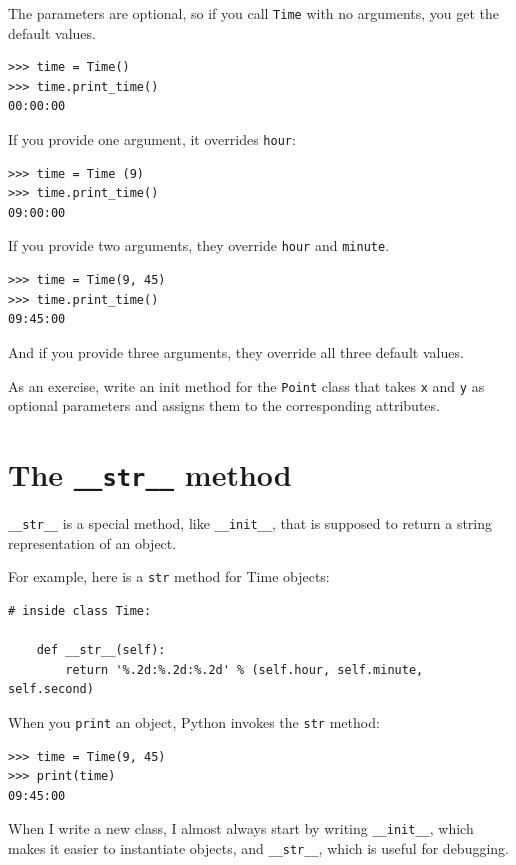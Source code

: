 \documentclass[10pt]{book}
\begin{document}
The parameters are optional, so if you call {\tt Time} with
no arguments, you get the default values.

\begin{verbatim}
>>> time = Time()
>>> time.print_time()
00:00:00
\end{verbatim}
%
If you provide one argument, it overrides {\tt hour}:

\begin{verbatim}
>>> time = Time (9)
>>> time.print_time()
09:00:00
\end{verbatim}
%
If you provide two arguments, they override {\tt hour} and
{\tt minute}.

\begin{verbatim}
>>> time = Time(9, 45)
>>> time.print_time()
09:45:00
\end{verbatim}
%
And if you provide three arguments, they override all three
default values.

As an exercise, write an init method for the {\tt Point} class that takes
{\tt x} and {\tt y} as optional parameters and assigns
them to the corresponding attributes.


\section{The {\tt \_\_str\_\_} method}

\verb"__str__" is a special method, like \verb"__init__",
that is supposed to return a string representation of an object.

For example, here is a {\tt str} method for Time objects:

\begin{verbatim}
# inside class Time:

    def __str__(self):
        return '%.2d:%.2d:%.2d' % (self.hour, self.minute, self.second)
\end{verbatim}
%
When you {\tt print} an object, Python invokes the {\tt str} method:

\begin{verbatim}
>>> time = Time(9, 45)
>>> print(time)
09:45:00
\end{verbatim}
%
When I write a new class, I almost always start by writing 
\verb"__init__", which makes it easier to instantiate objects, and 
\verb"__str__", which is useful for debugging.
\end{document}
